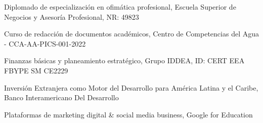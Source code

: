 
\begin{scholarship}


    {Diplomado de especialización en ofimática profesional, Escuela Superior de Negocios y Asesoría Profesional, NR: 49823}

    {Curso de redacción de documentos académicos, Centro de Competencias del Agua - CCA-AA-PICS-001-2022}

    {Finanzas básicas y planeamiento estratégico, Grupo IDDEA, ID: CERT EEA FBYPE SM CE2229}

    {Inversión Extranjera como Motor del Desarrollo para América Latina y el Caribe, Banco Interamericano Del Desarrollo}

    {Plataformas de marketing digital \& social media business, Google for Education}











\end{scholarship}

